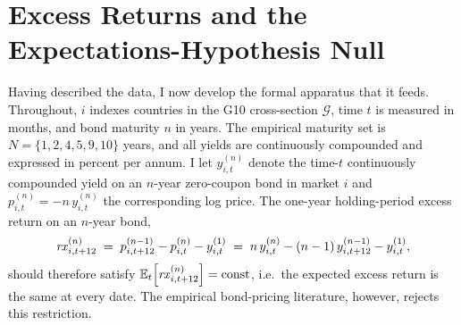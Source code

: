 
\section{Excess Returns and the Expectations-Hypothesis Null}
\label{sec:fw-returns}
\label{sec:fw-eh}

Having described the data, I now develop the formal apparatus that it feeds.
Throughout, $i$ indexes countries in the G10 cross-section $\mathcal{G}$, time
$t$ is measured in months, and bond maturity $n$ in years. The empirical
maturity set is $N=\{1,2,4,5,9,10\}$ years, and all yields are continuously
compounded and expressed in percent per annum. I let $y^{(n)}_{i,t}$ denote the time-$t$
continuously compounded yield on an $n$-year zero-coupon bond in market $i$ and
$p^{(n)}_{i,t}=-n\,y^{(n)}_{i,t}$ the corresponding log price. The one-year
holding-period excess return on an $n$-year bond,
\begin{equation}
  \mathit{rx}^{(n)}_{i,t+12} \;=\; p^{(n-1)}_{i,t+12}-p^{(n)}_{i,t}-y^{(1)}_{i,t}
                  \;=\; n\,y^{(n)}_{i,t}-(n-1)\,y^{(n-1)}_{i,t+12}-y^{(1)}_{i,t},
  \label{eq:rx}
\end{equation}
should therefore satisfy $\mathbb{E}_{t}\!\left[\mathit{rx}^{(n)}_{i,t+12}\right]=\text{const}$,
i.e.\ the expected excess return is the same at every date. The empirical
bond-pricing literature, however, rejects this restriction.

